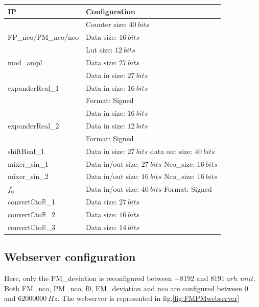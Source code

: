\documentclass[12pt,oneside]{article}
\begin{document}
\begin{center}
	\begin{tabular}{|>{\centering\arraybackslash}m{.3\linewidth} | >{\centering\arraybackslash}m{.3\linewidth} |}
		\hline
		IP & Configuration \\
		\hline
		& Counter size: $40~bits$\\ FP\_nco/PM\_nco/nco &Data size: $16~bits$\\ &Lut size: $12~bits$ \\
		\hline
		mod\_ampl&Data size: $27~bits$ \\
		\hline
		& Data in size: $27~bits$\\expanderReal\_1 & Data in size: $16~bits$\\ &Format: Signed \\
		\hdashline
		& Data in size: $16~bits$\\expanderReal\_2 & Data in size: $12~bits$\\ &Format: Signed \\
		\hline
		shiftReal\_1&Data in size: $27~bits$ \newline data out size: $40~bits$ \\
		\hline
		mixer\_sin\_1&Data in/out size: $27~bits$ \newline Nco\_size: $16~bits$ \\
		\hdashline
		mixer\_sin\_2&Data in/out size: $16~bits$ \newline Nco\_size: $16~bits$ \\
		\hline
		$f_0$&Data in/out size: $40~bits$ \newline Format: Signed \\
		\hline
		convert$\mathbb{C}$to$\mathbb{R}$\_1&Data size: $27~bits$\\
		\hdashline
		convert$\mathbb{C}$to$\mathbb{R}$\_2&Data size: $16~bits$\\
		\hdashline
		convert$\mathbb{C}$to$\mathbb{R}$\_3&Data size: $14~bits$\\
		\hline
	\end{tabular}
\end{center}

\vspace{0.5cm}
\subsection{Webserver configuration}

Here, only the PM\_deviation is reconfigured between $-8192$ and $8191~arb.~unit$. Both FM\_nco, PM\_nco, f0, FM\_deviation and nco are configured between $0$ and $62000000~Hz$. The webserver is represented in fig.\ref{fig:FMPMwebserver}
\end{document}
